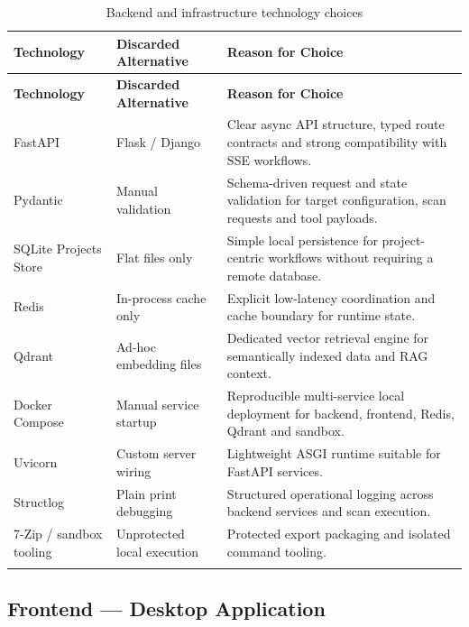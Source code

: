 \documentclass[12pt,a4paper]{report}
\begin{document}
\renewcommand{\arraystretch}{1.35}
\begin{longtable}{|p{}|p{}|p{}|}
\hline
\textbf{Technology} & \textbf{Discarded Alternative} & \textbf{Reason for Choice} \\
\hline
\endfirsthead
\hline
\textbf{Technology} & \textbf{Discarded Alternative} & \textbf{Reason for Choice} \\
\hline
\endhead
FastAPI & Flask / Django & Clear async API structure, typed route contracts
and strong compatibility with SSE workflows. \\
\hline
Pydantic & Manual validation & Schema-driven request and state validation
for target configuration, scan requests and tool payloads. \\
\hline
SQLite Projects Store & Flat files only & Simple local persistence for
project-centric workflows without requiring a remote database. \\
\hline
Redis & In-process cache only & Explicit low-latency coordination and cache
boundary for runtime state. \\
\hline
Qdrant & Ad-hoc embedding files & Dedicated vector retrieval engine for
semantically indexed data and RAG context. \\
\hline
Docker Compose & Manual service startup & Reproducible multi-service local
deployment for backend, frontend, Redis, Qdrant and sandbox. \\
\hline
Uvicorn & Custom server wiring & Lightweight ASGI runtime suitable for
FastAPI services. \\
\hline
Structlog & Plain print debugging & Structured operational logging across
backend services and scan execution. \\
\hline
7-Zip / sandbox tooling & Unprotected local execution & Protected export
packaging and isolated command tooling. \\
\hline
\caption{Backend and infrastructure technology choices}
\label{tab:backend_stack}
\end{longtable}

\subsection{Frontend --- Desktop Application}
\end{document}
